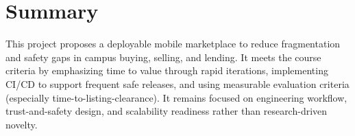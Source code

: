 \documentclass[11pt]{article}
\begin{document}
\section{Summary}
This project proposes a deployable mobile marketplace to reduce fragmentation and safety gaps in campus buying, selling, and lending. It meets the course criteria by emphasizing time to value through rapid iterations, implementing CI/CD to support frequent safe releases, and using measurable evaluation criteria (especially time-to-listing-clearance). It remains focused on engineering workflow, trust-and-safety design, and scalability readiness rather than research-driven novelty.
\end{document}
